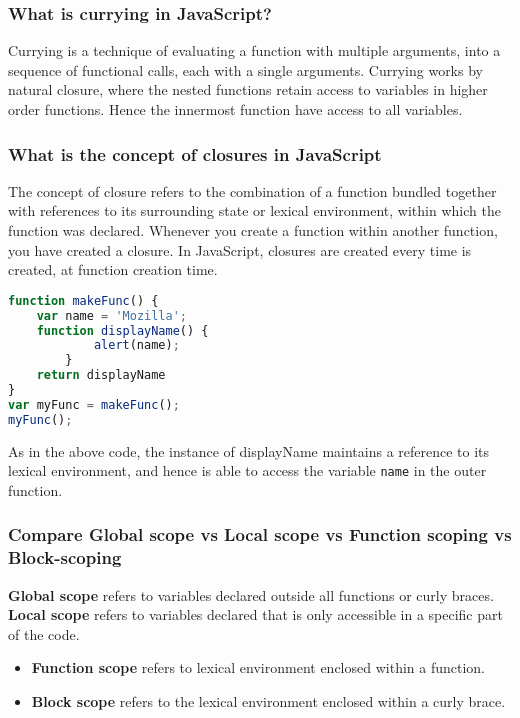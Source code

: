 \documentclass[12pt, a4paper]{article}
\newcommand{\code}[1]{\texttt{#1}}
\begin{document}
\subsubsection*{What is currying in JavaScript?}
Currying is a technique of evaluating a function with multiple arguments, into a sequence of functional calls, each with a single arguments.\newline
Currying works by natural closure, where the nested functions retain access to variables in higher order functions.
Hence the innermost function have access to all variables.

\subsubsection*{What is the concept of closures in JavaScript}
The concept of closure refers to the combination of a function bundled together with references to its surrounding state or lexical environment, within which the function was declared.
Whenever you create a function within another function, you have created a closure.
In JavaScript, closures are created every time is created, at function creation time.
\begin{mdframed}[backgroundcolor=light-gray, roundcorner=10pt,leftmargin=1, rightmargin=1, innerleftmargin=20, innertopmargin=5,innerbottommargin=5, outerlinewidth=1, linecolor=light-gray]
\begin{lstlisting}[language=JavaScript]
function makeFunc() {
    var name = 'Mozilla';
    function displayName() {
            alert(name);
        }
    return displayName
}
var myFunc = makeFunc();
myFunc();

\end{lstlisting}
\end{mdframed}


As in the above code, the instance of displayName maintains a reference to its lexical environment, and hence is able to access the variable \code{name} in the outer function.

\subsubsection*{Compare Global scope vs Local scope vs Function scoping vs Block-scoping}
\textbf{Global scope} refers to variables declared outside all functions or curly braces.\newline
\textbf{Local scope} refers to variables declared that is only accessible in a specific part of the code.
\begin{itemize}
    \item \textbf{Function scope} refers to lexical environment enclosed within a function.
    \item \textbf{Block scope} refers to the lexical environment enclosed within a curly brace.
\end{itemize}
\end{document}
